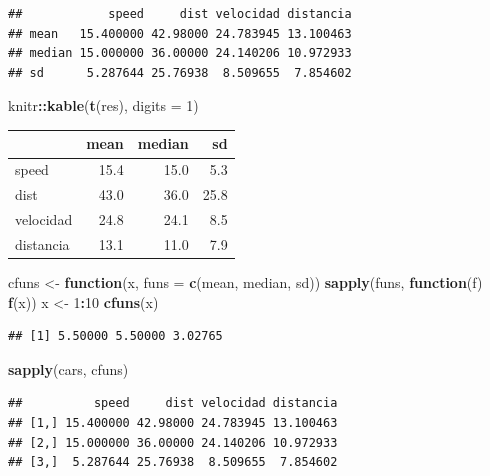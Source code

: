 \documentclass[]{book}
\newenvironment{Shaded}{\begin{snugshade}}{\end{snugshade}}
\newcommand{\KeywordTok}[1]{\textcolor[rgb]{0.13,0.29,0.53}{\textbf{#1}}}
\newcommand{\DataTypeTok}[1]{\textcolor[rgb]{0.13,0.29,0.53}{#1}}
\newcommand{\DecValTok}[1]{\textcolor[rgb]{0.00,0.00,0.81}{#1}}
\newcommand{\StringTok}[1]{\textcolor[rgb]{0.31,0.60,0.02}{#1}}
\newcommand{\ControlFlowTok}[1]{\textcolor[rgb]{0.13,0.29,0.53}{\textbf{#1}}}
\newcommand{\OperatorTok}[1]{\textcolor[rgb]{0.81,0.36,0.00}{\textbf{#1}}}
\newcommand{\NormalTok}[1]{#1}
\begin{document}
\begin{verbatim}
##            speed     dist velocidad distancia
## mean   15.400000 42.98000 24.783945 13.100463
## median 15.000000 36.00000 24.140206 10.972933
## sd      5.287644 25.76938  8.509655  7.854602
\end{verbatim}

\begin{Shaded}
\begin{Highlighting}[]
\NormalTok{knitr}\OperatorTok{::}\KeywordTok{kable}\NormalTok{(}\KeywordTok{t}\NormalTok{(res), }\DataTypeTok{digits =} \DecValTok{1}\NormalTok{)}
\end{Highlighting}
\end{Shaded}

\begin{tabular}{l|r|r|r}
\hline
  & mean & median & sd\\
\hline
speed & 15.4 & 15.0 & 5.3\\
\hline
dist & 43.0 & 36.0 & 25.8\\
\hline
velocidad & 24.8 & 24.1 & 8.5\\
\hline
distancia & 13.1 & 11.0 & 7.9\\
\hline
\end{tabular}

\begin{Shaded}
\begin{Highlighting}[]
\NormalTok{cfuns <-}\StringTok{ }\ControlFlowTok{function}\NormalTok{(x, }\DataTypeTok{funs =} \KeywordTok{c}\NormalTok{(mean, median, sd))}
            \KeywordTok{sapply}\NormalTok{(funs, }\ControlFlowTok{function}\NormalTok{(f) }\KeywordTok{f}\NormalTok{(x))}
\NormalTok{x <-}\StringTok{ }\DecValTok{1}\OperatorTok{:}\DecValTok{10}
\KeywordTok{cfuns}\NormalTok{(x)}
\end{Highlighting}
\end{Shaded}

\begin{verbatim}
## [1] 5.50000 5.50000 3.02765
\end{verbatim}

\begin{Shaded}
\begin{Highlighting}[]
\KeywordTok{sapply}\NormalTok{(cars, cfuns)}
\end{Highlighting}
\end{Shaded}

\begin{verbatim}
##          speed     dist velocidad distancia
## [1,] 15.400000 42.98000 24.783945 13.100463
## [2,] 15.000000 36.00000 24.140206 10.972933
## [3,]  5.287644 25.76938  8.509655  7.854602
\end{verbatim}
\end{document}
